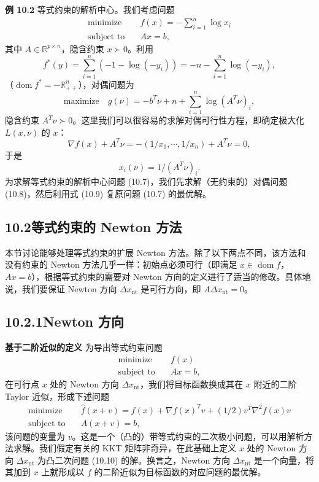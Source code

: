 \documentclass[UTF8, 12pt, fontset=fandol, oneside]{ctexart}
\begin{document}
\noindent\textbf{例 10.2}\quad
等式约束的解析中心。我们考虑问题
\begin{equation}
\begin{aligned}
\text{minimize}\quad & f(x)=-\sum_{i=1}^n\log x_i\\
\text{subject to}\quad & Ax=b,
\end{aligned}
\tag{10.7}
\end{equation}
其中 $A\in\mathbb{R}^{p\times n}$，隐含约束 $x\succ 0$。利用
\[
f^\ast(y)=\sum_{i=1}^n(-1-\log(-y_i))=-n-\sum_{i=1}^n\log(-y_i),
\]
（$\operatorname{dom} f^\ast=-\mathbb{R}_{++}^n$），对偶问题为
\begin{equation}
\text{maximize}\quad g(\nu)=-b^T\nu+n+\sum_{i=1}^n\log(A^T\nu)_i,
\tag{10.8}
\end{equation}
隐含约束 $A^T\nu\succ 0$。这里我们可以很容易的求解对偶可行性方程，即确定极大化 $L(x,\nu)$ 的 $x$：
\[
\nabla f(x)+A^T\nu=-(1/x_1,\cdots,1/x_n)+A^T\nu=0,
\]
于是
\begin{equation}
x_i(\nu)=1/(A^T\nu)_i.
\tag{10.9}
\end{equation}
为求解等式约束的解析中心问题 (10.7)，我们先求解（无约束的）对偶问题 (10.8)，然后利用式 (10.9) 复原问题 (10.7) 的最优解。

\subsection*{10.2\quad 等式约束的 Newton 方法}

本节讨论能够处理等式约束的扩展 Newton 方法。除了以下两点不同，该方法和没有约束的 Newton 方法几乎一样：初始点必须可行（即满足 $x\in\operatorname{dom} f$，$Ax=b$），根据等式约束的需要对 Newton 方向的定义进行了适当的修改。具体地说，我们要保证 Newton 方向 $\Delta x_{\mathrm{nt}}$ 是可行方向，即 $A\Delta x_{\mathrm{nt}}=0$。

\subsection*{10.2.1\quad Newton 方向}

\noindent\textbf{基于二阶近似的定义}\quad
为导出等式约束问题
\[
\begin{aligned}
\text{minimize}\quad & f(x)\\
\text{subject to}\quad & Ax=b,
\end{aligned}
\]
在可行点 $x$ 处的 Newton 方向 $\Delta x_{\mathrm{nt}}$，我们将目标函数换成其在 $x$ 附近的二阶 Taylor 近似，形成下述问题
\begin{equation}
\begin{aligned}
\text{minimize}\quad & \hat{f}(x+v)=f(x)+\nabla f(x)^Tv+(1/2)v^T\nabla^2 f(x)v\\
\text{subject to}\quad & A(x+v)=b,
\end{aligned}
\tag{10.10}
\end{equation}
该问题的变量为 $v$。这是一个（凸的）带等式约束的二次极小问题，可以用解析方法求解。我们假定有关的 KKT 矩阵非奇异，在此基础上定义 $x$ 处的 Newton 方向 $\Delta x_{\mathrm{nt}}$ 为凸二次问题 (10.10) 的解。换言之，Newton 方向 $\Delta x_{\mathrm{nt}}$ 是一个向量，将其加到 $x$ 上就形成以 $f$ 的二阶近似为目标函数的对应问题的最优解。
\end{document}

